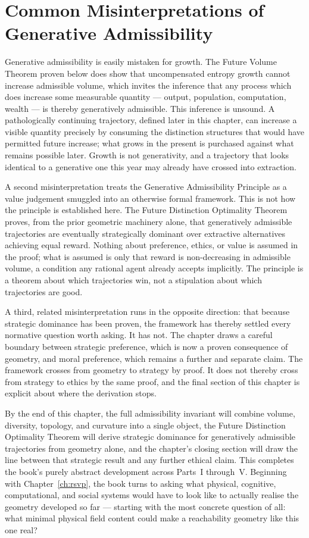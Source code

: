 \documentclass[12pt,twoside,openright]{book}
\begin{document}
\section{Common Misinterpretations of Generative
  Admissibility}
\label{sec:ch15-misinterpretations}

Generative admissibility is easily mistaken for growth. The
Future Volume Theorem proven below does show that
uncompensated entropy growth cannot increase admissible
volume, which invites the inference that any process which
does increase some measurable quantity --- output,
population, computation, wealth --- is thereby generatively
admissible. This inference is unsound. A pathologically
continuing trajectory, defined later in this chapter, can
increase a visible quantity precisely by consuming the
distinction structures that would have permitted future
increase; what grows in the present is purchased against
what remains possible later. Growth is not generativity, and
a trajectory that looks identical to a generative one this
year may already have crossed into extraction.

A second misinterpretation treats the Generative
Admissibility Principle as a value judgement smuggled into
an otherwise formal framework. This is not how the principle
is established here. The Future Distinction Optimality
Theorem proves, from the prior geometric machinery alone,
that generatively admissible trajectories are eventually
strategically dominant over extractive alternatives achieving
equal reward. Nothing about preference, ethics, or value is
assumed in the proof; what is assumed is only that reward is
non-decreasing in admissible volume, a condition any rational
agent already accepts implicitly. The principle is a theorem
about which trajectories win, not a stipulation about which
trajectories are good.

A third, related misinterpretation runs in the opposite
direction: that because strategic dominance has been proven,
the framework has thereby settled every normative question
worth asking. It has not. The chapter draws a careful
boundary between strategic preference, which is now a proven
consequence of geometry, and moral preference, which remains
a further and separate claim. The framework crosses from
geometry to strategy by proof. It does not thereby cross
from strategy to ethics by the same proof, and the final
section of this chapter is explicit about where the
derivation stops.

By the end of this chapter, the full admissibility invariant
will combine volume, diversity, topology, and curvature into
a single object, the Future Distinction Optimality Theorem
will derive strategic dominance for generatively admissible
trajectories from geometry alone, and the chapter's closing
section will draw the line between that strategic result and
any further ethical claim. This completes the book's purely
abstract development across Parts~I through~V. Beginning with
Chapter~\ref{ch:rsvp}, the book turns to asking what physical,
cognitive, computational, and social systems would have to
look like to actually realise the geometry developed so far
--- starting with the most concrete question of all: what
minimal physical field content could make a reachability
geometry like this one real?
\end{document}
